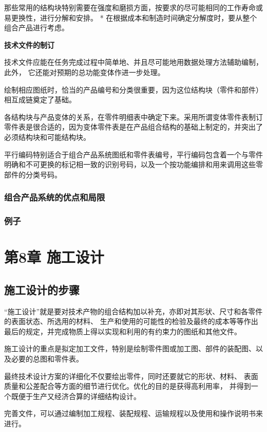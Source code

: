 \documentclass[letterpaper,10pt,english]{sphinxmanual}
\begin{document}
那些常用的结构块特别需要在强度和磨损方面，按要求的尽可能相同的工作寿命或易更换性，进行分解和安排。
* 在根据成本和制造时间确定分解度时，要从整个组合产品进行考虑。

\textbf{技术文件的制订}

技术文件应能在任务完成过程中简单地、并且尽可能地用数据处理方法辅助编制，此外，
它还能对预期的总功能变体作进一步处理。

绘制相应图纸时，恰当的产品编号和分类很重要，因为这位结构块（零件和部件）相互成链奠定了基础。

各结构块与产品变体的关系，在零件明细表中确定下来。采用所谓变体零件表制订零件表是很合适的，因为变体零件表是在产品组合结构的基础上制定的，并突出了必须结构块和可能结构块。

平行编码特别适合于组合产品系统图纸和零件表编号，平行编码包含着一个与零件明确和不可更换的标记相一致的识别号码，以及一个按功能编排和用来调用这些零部件的分类号码。


\subsection{组合产品系统的优点和局限}
\label{unit7:id12}

\subsection{例子}
\label{unit7:id13}

\chapter{第8章 施工设计}
\label{unit8::doc}\label{unit8:id1}

\section{施工设计的步骤}
\label{unit8:id2}
“施工设计”就是要对技术产物的组合结构加以补充，亦即对其形状、尺寸和各零件的表面状态、所选用的材料、
生产和使用的可能性的检验及最终的成本等等作出最后的规定，并完成物质上得以实现和利用的有约束力的图纸和其他文件。

施工设计的重点是拟定加工文件，特别是绘制零件图或加工图、部件的装配图、以及必要的总图和零件表。

最终技术设计方案的详细化不仅要绘出零件，同时还要就它的形状、材料、
表面质量和公差配合等方面的细节进行优化。优化的目的是获得高利用率，
并得到一个既便于生产又经济合算的详细结构设计。

完善文件，可以通过编制加工规程、装配规程、运输规程以及使用和操作说明书来进行。
\end{document}
